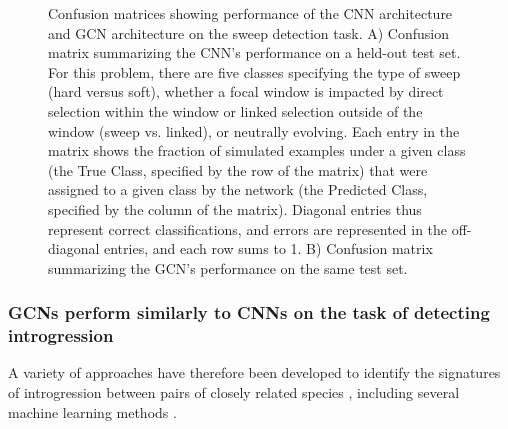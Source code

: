 \begin{figure}
    \centering
    \caption[Confusion matrices showing performance of the CNN architecture and GCN architecture on the sweep detection task]{Confusion matrices showing performance of the CNN architecture and GCN architecture on the sweep detection task. A) Confusion matrix summarizing the CNN’s performance on a held-out test set. For this problem, there are five classes specifying the type of sweep (hard versus soft), whether a focal window is impacted by direct selection within the window or linked selection outside of the window (sweep vs. linked), or neutrally evolving. Each entry in the matrix shows the fraction of simulated examples under a given class (the True Class, specified by the row of the matrix) that were assigned to a given class by the network (the Predicted Class, specified by the column of the matrix). Diagonal entries thus represent correct classifications, and errors are represented in the off-diagonal entries, and each row sums to 1. B) Confusion matrix summarizing the GCN’s performance on the same test set.}
    \label{fig:2_4}
    
\end{figure}



\subsubsection{GCNs perform similarly to CNNs on the task of detecting introgression}

A variety of approaches have therefore been developed to identify the signatures of introgression between pairs of closely related species \cite{hudsonEstimationLevelsGene1992,husonReconstructionReticulateNetworks2005,rosenzweigPowerfulMethodsDetecting2016}, including several machine learning methods \cite{gowerDetectingAdaptiveIntrogression2021,rayIntroUNETIdentifyingIntrogressed2023,schriderSupervisedMachineLearning2018a,schriderSupervisedMachineLearning2018a}.

